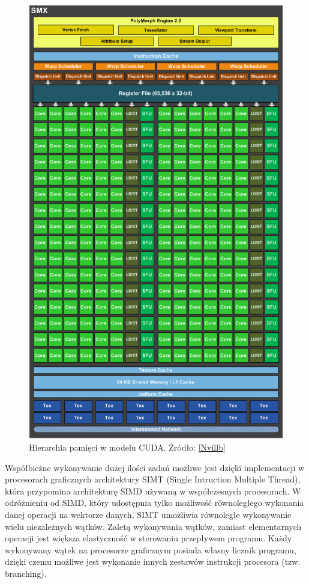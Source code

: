 \begin{figure}[H]
\centering
\includegraphics[scale=0.3]{images/kepler-SMX-overview.png}
\caption{Hierarchia pamięci w modelu CUDA. Źródło: \ref{Nvillb}}
\label{hier}
\end{figure}

Współbieżne wykonywanie dużej ilości zadań możliwe jest dzięki implementacji
w procesorach graficznych architektury SIMT (Single Intruction Multiple Thread), która
przypomina architekturę SIMD używaną w współczesnych procesorach. W
odróżnieniu od SIMD, który udostępnia tylko możliwość równoległego wykonania danej
operacji na wektorze danych, SIMT umożliwia równoległe wykonywanie wielu
niezależnych wątków. Zaletą wykonywania wątków, zamiast elementarnych operacji jest większa
elastyczność w sterowaniu przepływem programu. Każdy wykonywany wątek
na procesorze graficznym posiada własny licznik programu, dzięki czemu możliwe
jest wykonanie innych zestawów instrukcji procesora (tzw. branching).

